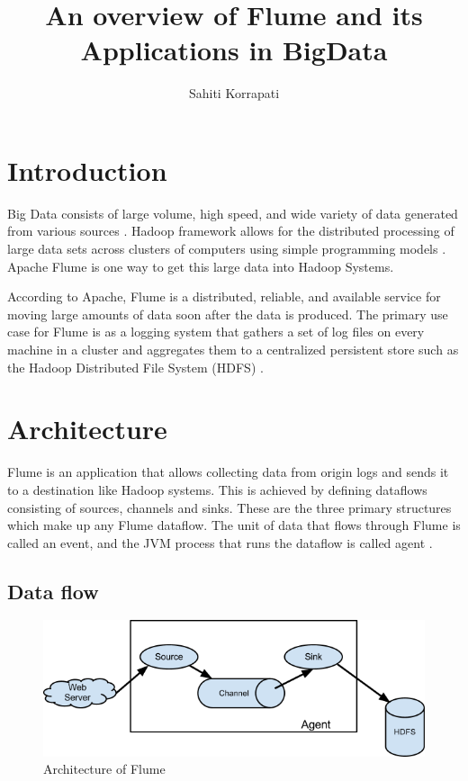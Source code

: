 \documentclass[9pt,twocolumn,twoside]{../../styles/osajnl}
\title{An overview of Flume and its Applications in BigData }
\author[1,*]{Sahiti Korrapati}
\affil[1]{School of Informatics and Computing, Bloomington, IN 47408, U.S.A.}
\affil[*]{Corresponding authors: sakorrap@iu.edu, S17-IR-2013}
\begin{document}
\maketitle

\section{Introduction}

Big Data consists of large volume, high speed, and wide variety of data generated from various sources \cite{tutorialspoint}. Hadoop framework allows for the distributed processing of large data sets across clusters of computers using simple programming models \cite{hadoop}. Apache Flume is one way to get this large data into Hadoop Systems.

According to Apache, Flume is a distributed, reliable, and available service for moving large amounts of data soon after the data is produced. The primary use case for Flume is as a logging system that gathers a set of log files on every machine in a cluster and aggregates them to a centralized persistent store such as the Hadoop Distributed File System (HDFS) \cite{user-manual}.

\section{Architecture}

Flume is an application that allows collecting data from origin logs and sends it to a destination like Hadoop systems. This is achieved by defining dataflows consisting of sources, channels and sinks. These are the three primary structures which make up any Flume dataflow. The  unit of data that flows through Flume is called an event, and the JVM process that runs the dataflow is called agent \cite{user-manual}.

\subsection{Data flow}

\begin{figure}[htbp]
\centering
\includegraphics[width=\linewidth]{images/FlumeArchitecture.png}
\caption{Architecture of Flume \cite{user-manual}}
\label{fig:FA}
\end{figure}
\end{document}
